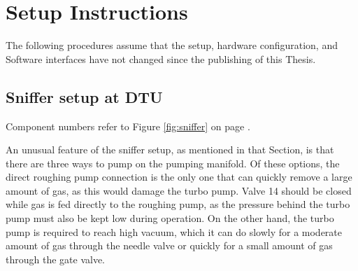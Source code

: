 
\chapter{Setup Instructions}\label{app:instructions}

The following procedures assume that the setup, hardware configuration, and Software interfaces have not changed since the publishing of this Thesis.

\section{Sniffer setup at DTU}\label{app:sniffer}

Component numbers refer to Figure \ref{fig:sniffer} on page \pageref{fig:sniffer}.

An unusual feature of the sniffer setup, as mentioned in that Section, is that there are three ways to pump on the pumping manifold. Of these options, the direct roughing pump connection is the only one that can quickly remove a large amount of gas, as this would damage the turbo pump. Valve 14 should be closed while gas is fed directly to the roughing pump, as the pressure behind the turbo pump must also be kept low during operation. On the other hand, the turbo pump is required to reach high vacuum, which it can do slowly for a moderate amount of gas through the needle valve or quickly for a small amount of gas through the gate valve.

